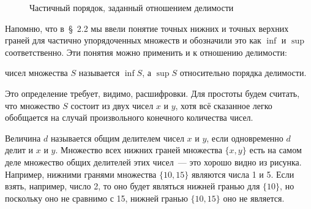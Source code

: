 \begin{figure}[h]
\centering
{}
\caption{Частичный порядок, заданный отношением делимости}
\end{figure}

Напомню, что в~\S~2.2 мы ввели понятие точных нижних и точных верхних граней для частично упорядоченных множеств и обозначили это как $\inf$ и $\sup$ соответственно. Эти понятия можно применить и к отношению делимости:

\begin{definition}
 чисел множества $S$ называется $\inf S$, а  $\sup S$ относительно порядка делимости.
\end{definition}

Это определение требует, видимо, расшифровки. Для простоты будем считать, что множество $S$ состоит из двух чисел $x$ и $y$, хотя всё сказанное легко обобщается на случай произвольного конечного количества чисел.

Величина $d$ называется общим делителем чисел $x$ и $y$, если одновременно $d$ делит и $x$ и $y$. Множество всех нижних граней множества $\{x, y\}$ есть на самом деле множество общих делителей этих чисел~--- это хорошо видно из рисунка. Например, нижними гранями множества $\{10, 15\}$ являются числа 1 и 5. Если взять, например, число 2, то оно будет являться нижней гранью для $\{10\}$, но поскольку оно не сравнимо с 15, нижней гранью $\{10, 15\}$ оно не является.

